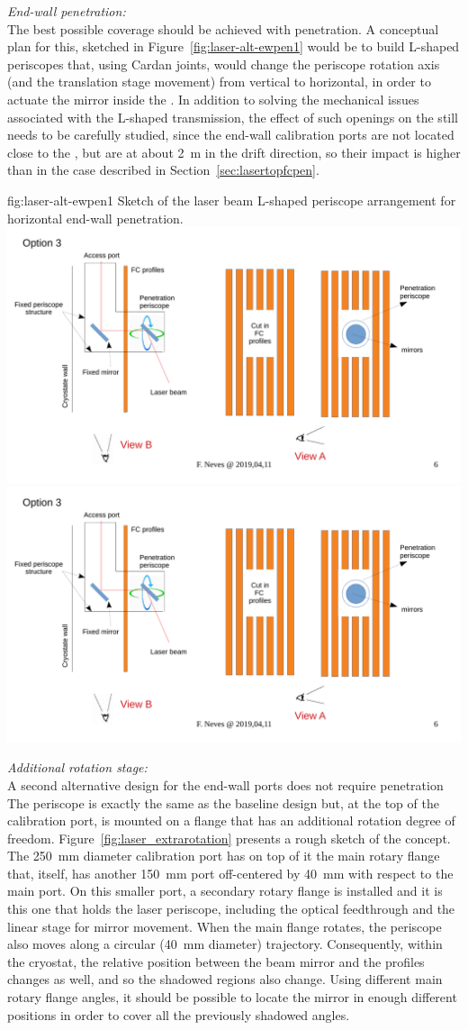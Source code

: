 {\it End-wall  penetration:}\\ 
The best possible  coverage should be achieved with  penetration. A conceptual plan for this, sketched in Figure~\ref{fig:laser-alt-ewpen1} would be to build L-shaped periscopes that, using Cardan joints, would change the periscope rotation axis (and the translation stage movement) from vertical to horizontal, in order to actuate the mirror inside the . In addition to solving the mechanical issues associated with the L-shaped transmission, the effect of such openings on the \efield still needs to be carefully studied, since the end-wall calibration ports are not located close to the , but are at about \SI{2}{\m} in the drift direction, so their impact is higher than in the case described in Section~\ref{sec:lasertopfcpen}.

\begin{dunefigure}{fig:laser-alt-ewpen1}
{Sketch of the laser beam L-shaped periscope arrangement for horizontal end-wall  penetration.}
\includegraphics[width=0.5\linewidth]{graphics/laser-alt-ewpen1.pdf}
\includegraphics[width=0.3\linewidth]{graphics/laser-alt-ewpen2.pdf}
\end{dunefigure}

{\it Additional rotation stage:}\\ 
A second alternative design for the end-wall ports does not require  penetration
The periscope is exactly the same as the baseline design but, at the top of the calibration port, is mounted on a flange that has an additional rotation degree of freedom. Figure~\ref{fig:laser_extrarotation} presents a rough sketch of the concept. The \SI{250}{\milli\m} diameter calibration port has on top of it the main rotary flange that, itself, has another \SI{150}{\milli\m} port off-centered by \SI{40}{\milli\m} with respect to the main port. On this smaller port, a secondary rotary flange is installed and it is this one that holds the laser periscope, including the optical feedthrough and the linear stage for mirror movement. When the main flange rotates, the periscope also moves along a circular (\SI{40}{\milli\m} diameter) trajectory. Consequently, within the cryostat, the relative position between the beam mirror and the  profiles changes as well, and so the shadowed regions also change. Using different main rotary flange angles, it should be possible to locate the mirror in enough different positions in order to cover all the previously shadowed angles.

